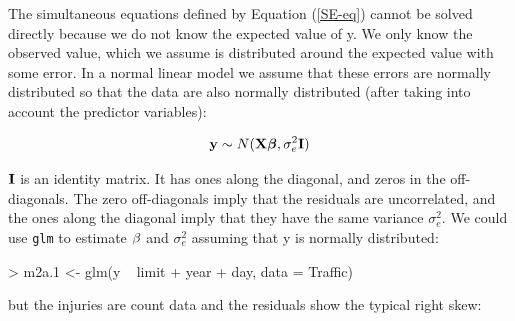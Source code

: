 \documentclass{article}
\begin{document}
The simultaneous equations defined by Equation (\ref{SE-eq}) cannot be solved directly because we do not know the expected value of y. We only know the observed value, which we assume is distributed around the expected value with some error. In a normal linear model we assume that these errors are normally distributed so that the data are also normally distributed (after taking into account the predictor variables):

\begin{equation}
{\bf y} \sim N({\bf X}{\bm \beta}, \sigma^{2}_{e}{\bf I})
\end{equation}	

${\bf I}$ is an identity matrix. It has ones along the diagonal, and zeros in the off-diagonals. The zero off-diagonals imply that the residuals are uncorrelated, and the ones along the diagonal imply that they have the same variance  $\sigma^{2}_{e}$. We could use \texttt{glm} to estimate ${\bf \beta}$ and  $\sigma^{2}_{e}$ assuming that y is normally distributed: 

\begin{Schunk}
\begin{Sinput}
> m2a.1 <- glm(y ~ limit + year + day, data = Traffic)
\end{Sinput}
\end{Schunk}

but the injuries are count data and the residuals show the typical right skew:

\iftalk
\else
\begin{Schunk}
\end{Schunk}
\fi
\end{document}
